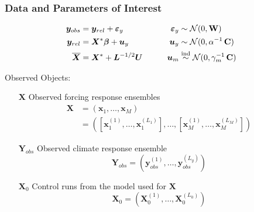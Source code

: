 \documentclass{beamer}
\newcommand{\C}{\ensuremath{\text{Cov}}}
\def\*#1{\bm{#1}}
\def\C{\textbf{\text{C}}}
\def\W{\textbf{\text{W}}}
\begin{document}
\begin{frame}
\frametitle{Data and Parameters of Interest}

\begin{block}{}
\vspace*{-\baselineskip}\setlength\belowdisplayshortskip{0pt}
\begin{alignat*}{3}
\*y_{obs} &= \*y_{rel} + \*\varepsilon_y  \qquad \quad &\*\varepsilon_y &\sim \mathcal N(0,\W)\\
\*y_{rel} &= \*X^* \*\beta + \*u_y \nonumber  \qquad  &\*u_y &\sim \mathcal N(0,\alpha^{-1}\,\C) \\
\overline{\*X} &= \*X^* + \*L^{-1/2} \*U \qquad    &\*u_m &\stackrel{\text{ind}}{\sim} \mathcal N(0,\gamma_m^{-1} \, \C)  \:
\end{alignat*}
\end{block}

\alert{Observed Objects:}

\begin{itemize}
\item[$\*X$] Observed forcing response ensembles
\begin{align*}
\*X &= (\*x_1, \dots, \*x_M)\\
&= \left(  [\*x_1^{(1)}, \dots, \*x_1^{(L_1)} ], \dots, [\*x_M^{(1)}, \dots, \*x_M^{(L_M)} ] \right)
\end{align*}
\item[$\*Y_{obs}$] Observed climate response ensemble
\[
\*Y_{obs} = (\*y_{obs}^{(1)}, \dots, \*y_{obs}^{(L_y)})
\]
\item[$\*X_0$] Control runs from the model used for $\*X$
\[
\*X_0 = (\*X_0^{(1)}, \dots, \*X_0^{(L_0)})
\]
\end{itemize}

\end{frame}
\end{document}
